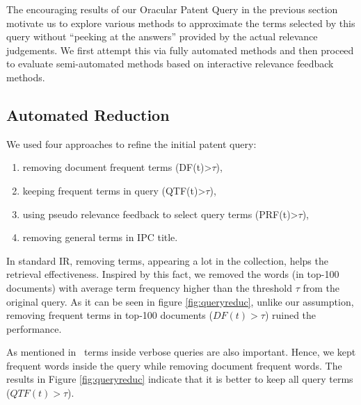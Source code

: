The encouraging results of our Oracular Patent Query in the previous
section motivate us to explore various methods to approximate the terms
selected by this query without ``peeking at the answers'' provided by
the actual relevance judgements.  We first attempt this via fully
automated methods and then proceed to evaluate semi-automated methods
based on interactive relevance feedback methods.

\subsection{Automated Reduction}
%
We used four approaches to refine the initial patent query: 
\begin{enumerate}
  \item removing document frequent terms (DF(t)>$\tau$),
  \item keeping frequent terms in query (QTF(t)>$\tau$),
  \item using pseudo relevance feedback to select query terms (PRF(t)>$\tau$), 
  \item removing general terms in IPC title. 
\end{enumerate}
In standard IR, removing terms, appearing a lot in the collection, helps the retrieval effectiveness. Inspired by this fact, we removed the words (in top-100 documents) with average term frequency higher than the threshold $\tau$ from the original query. As it can be seen in figure \ref{fig:queryreduc}, unlike our assumption, removing frequent terms in top-100 documents ($DF(t)>\tau$) ruined the performance.  

As mentioned in~\cite{maxwell2013compact} terms inside verbose queries are also important. Hence, we kept frequent words inside the query while removing document frequent words. The results in Figure \ref{fig:queryreduc} indicate that it is better to keep all query terms ($QTF(t)>\tau$). 

